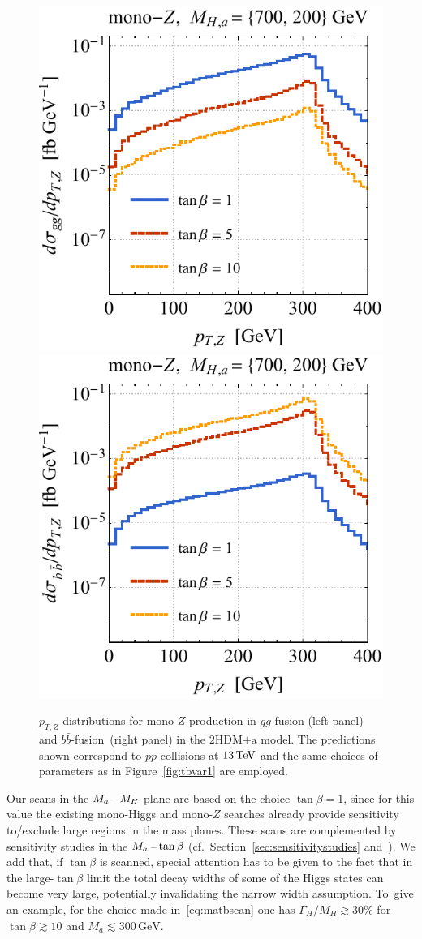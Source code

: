 \documentclass[review]{elsarticle}
\newcommand{\ma}{\ensuremath{M_{a}}\xspace}
\newcommand{\hdma}{\ensuremath{\textrm{2HDM+a}}\xspace}
\begin{document}
 \begin{figure}[t!]
\centering
\includegraphics[height=0.45\textwidth]{tblz.pdf} \qquad 
\includegraphics[height=0.45\textwidth]{tbrz.pdf}
\vspace{2mm}
\vspace{2mm}
\caption{\label{fig:tbvar2} 
$p_{T,Z}$ distributions for mono-$Z$ production in $gg$-fusion (left panel) and $b \bar b$-fusion~(right panel) in the \hdma model. The  predictions shown correspond to $pp$ collisions at $13 \, {\rm TeV}$ and the same choices of parameters as in Figure~\ref{fig:tbvar1} are employed.}
\end{figure}

Our  scans in the $M_{a}\hspace{0.5mm}$--$\hspace{0.5mm} M_H$ plane are based on the choice $\tan \beta = 1$, since for this value the existing mono-Higgs and mono-$Z$ searches already provide sensitivity to/exclude large regions in the mass planes.  These  scans are complemented by sensitivity studies in the $\ma \hspace{0.5mm}$--$\hspace{0.5mm} \tan \beta$ (cf.~Section~\ref{sec:sensitivitystudies} and~\cite{No:2015xqa,Bauer:2017ota,Pani:2017qyd}).  We add that, if $\tan \beta$ is scanned, special attention has to be given to the fact that in the large-$\tan \beta$ limit the total decay widths of some of the Higgs states can become very large, potentially invalidating the narrow width assumption.   To~give an example, for the choice made in~\eqref{eq:matbscan} one has $\Gamma_{H}/M_H \gtrsim 30\%$ for $\tan \beta \gtrsim 10$ and $M_a \lesssim 300 \, {\mathrm{GeV}}$. 
\end{document}
